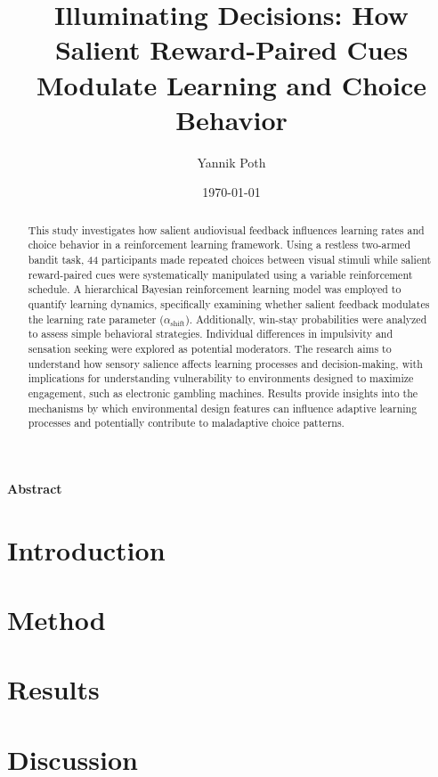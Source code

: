 \documentclass[man,english,donotrepeattitle]{apa7}
\title{Illuminating Decisions: How Salient Reward-Paired Cues Modulate Learning and Choice Behavior}
\author{Yannik Poth}
\affiliation{Rheinisch-Westfälische Technische Hochschule Aachen}
\date{\today}
\begin{document}
\maketitle %
\thispagestyle{titlepage} %

\pagestyle{empty} %

\newpage
\begin{center}
\textbf{Abstract}
\end{center}
\begin{abstract}
\noindent This study investigates how salient audiovisual feedback influences learning rates and choice behavior in a reinforcement learning framework. Using a restless two-armed bandit task, 44 participants made repeated choices between visual stimuli while salient reward-paired cues were systematically manipulated using a variable reinforcement schedule. A hierarchical Bayesian reinforcement learning model was employed to quantify learning dynamics, specifically examining whether salient feedback modulates the learning rate parameter ($\alpha_{\text{shift}}$). Additionally, win-stay probabilities were analyzed to assess simple behavioral strategies. Individual differences in impulsivity and sensation seeking were explored as potential moderators. The research aims to understand how sensory salience affects learning processes and decision-making, with implications for understanding vulnerability to environments designed to maximize engagement, such as electronic gambling machines. Results provide insights into the mechanisms by which environmental design features can influence adaptive learning processes and potentially contribute to maladaptive choice patterns.
\end{abstract}

\newpage
\tableofcontents
\newpage

\pagestyle{fancy} %

\section{Introduction}


\section{Method}


\section{Results}


\section{Discussion}


\printbibliography

\appendix

\end{document}
